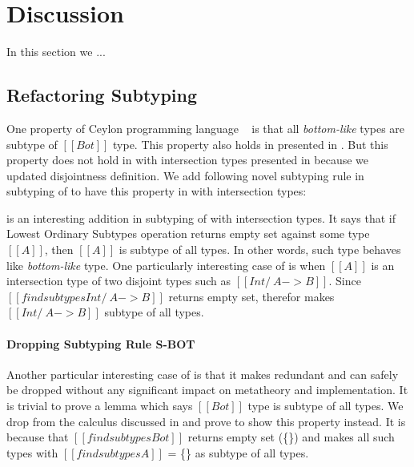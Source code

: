 \section{Discussion}
\label{sec:discussion}
In this section we ...


\subsection{Refactoring Subtyping}
\label{sec:inter:refactoring}

One property of Ceylon programming language ~\cite{} is that all \emph{bottom-like} types are 
subtype of $[[Bot]]$ type.
This property also holds in \cal presented in . But this property does not
hold in \cal with intersection types presented in  because we updated
disjointness definition. We add following novel subtyping rule in subtyping of
 to have this property in \cal with intersection types:

\begin{center}
\end{center}

\noindent {} is an interesting addition in subtyping of \cal with intersection types.
It says that if Lowest Ordinary Subtypes operation returns empty set against some type $[[A]]$, then $[[A]]$
is subtype of all types. In other words, such type behaves like \emph{bottom-like} type.
One particularly interesting case of  is when $[[A]]$ is an intersection type of two
disjoint types such as $[[Int /\ A -> B]]$. Since $[[findsubtypes Int /\ A -> B]]$ returns empty set,
therefor  makes $[[Int /\ A -> B]]$ subtype of all types.

\paragraph{Dropping Subtyping Rule S-BOT}
Another particular interesting case of  is that it makes  redundant 
and  can safely be dropped without any significant
impact on metatheory and implementation. It is trivial to prove a lemma which says $[[Bot]]$ type is
subtype of all types. We drop  from the calculus discussed in 
and prove  to show this property instead. It is because that $[[findsubtypes Bot]]$
returns empty set (\{\}) and  makes all such types with $[[findsubtypes A]]$ = \{\} as
subtype of all types.

